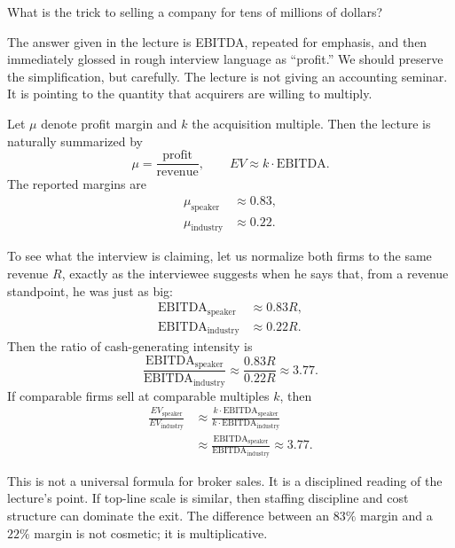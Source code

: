What is the trick to selling a company for tens of millions of dollars?

The answer given in the lecture is EBITDA, repeated for emphasis, and then immediately glossed in rough interview language as ``profit.'' We should preserve the simplification, but carefully. The lecture is not giving an accounting seminar. It is pointing to the quantity that acquirers are willing to multiply.

Let \(\mu\) denote profit margin and \(k\) the acquisition multiple. Then the lecture is naturally summarized by
\begin{equation}
\mu = \frac{\text{profit}}{\text{revenue}},\qquad EV \approx k\cdot \text{EBITDA}.
\end{equation}
The reported margins are
\begin{align}
\mu_{\text{speaker}} &\approx 0.83,\\
\mu_{\text{industry}} &\approx 0.22.
\end{align}

To see what the interview is claiming, let us normalize both firms to the same revenue \(R\), exactly as the interviewee suggests when he says that, from a revenue standpoint, he was just as big:
\begin{align}
\text{EBITDA}_{\text{speaker}} &\approx 0.83R,\\
\text{EBITDA}_{\text{industry}} &\approx 0.22R.
\end{align}
Then the ratio of cash-generating intensity is
\begin{equation}
\frac{\text{EBITDA}_{\text{speaker}}}{\text{EBITDA}_{\text{industry}}}
\approx
\frac{0.83R}{0.22R}
\approx 3.77.
\end{equation}
If comparable firms sell at comparable multiples \(k\), then
\begin{align}
\frac{EV_{\text{speaker}}}{EV_{\text{industry}}}
&\approx
\frac{k\cdot \text{EBITDA}_{\text{speaker}}}{k\cdot \text{EBITDA}_{\text{industry}}}\\
&\approx
\frac{\text{EBITDA}_{\text{speaker}}}{\text{EBITDA}_{\text{industry}}}
\approx 3.77.
\end{align}

This is not a universal formula for broker sales. It is a disciplined reading of the lecture's point. If top-line scale is similar, then staffing discipline and cost structure can dominate the exit. The difference between an \(83\%\) margin and a \(22\%\) margin is not cosmetic; it is multiplicative.

